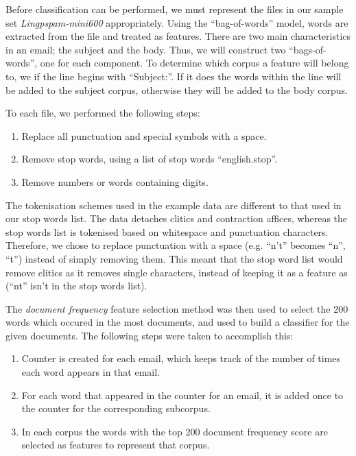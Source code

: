 \documentclass[10pt, a4paper]{article}
\begin{document}
Before classification can be performed, we must represent the files in our sample set \emph{Lingpspam-mini600} appropriately. Using the ``bag-of-words'' model, words are extracted from the file and treated as features. There are two main characteristics in an email; the subject and the body. Thus, we will construct two ``bags-of-words'', one for each component. To determine which corpus a feature will belong to, we if the line begins with ``Subject:''. If it does the words within the line will be added to the subject corpus, otherwise they will be added to the body corpus.

To each file, we performed the following steps:

\begin{enumerate}
	\item Replace all punctuation and special symbols with a space.
	\item Remove stop words, using a list of stop words ``english.stop''.
	\item Remove numbers or words containing digits.
\end{enumerate}

The tokenisation schemes used in the example data are different to that used in our stop words list. The data detaches clitics and contraction affices, whereas the stop words list is tokenised based on whitespace and punctuation characters. Therefore, we chose to replace punctuation with a space (e.g. ``n't'' becomes ``n'', ``t'') instead of simply removing them. This meant that the stop word list would remove clitics as it removes single characters, instead of keeping it as a feature as (``nt'' isn't in the stop words list).

The \emph{document frequency} feature selection method was then used to select the 200 words which occured in the most documents, and used to build a classifier for the given documents. The following steps were taken to accomplish this:

\begin{enumerate}
\item Counter is created for each email, which keeps track of the number of times each word appears in that email.
\item For each word that appeared in the counter for an email, it is added once to the counter for the corresponding subcorpus.
\item In each corpus the words with the top 200 document frequency score are selected as features to represent that corpus.
\end{enumerate}
\end{document}
